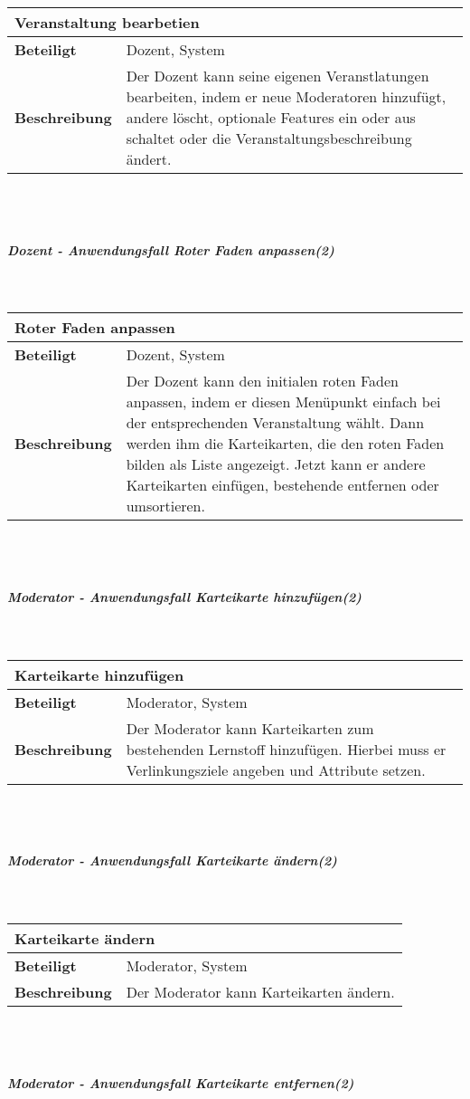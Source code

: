 \documentclass[12pt,a4paper]{article}
\begin{document}
\begin{tabular}{l p{10cm}}
\multicolumn{2}{l}{\textbf{Veranstaltung bearbetien}} \\ \hline
\textbf{Beteiligt} & Dozent, System \\ \hline 
\textbf{Beschreibung} & Der Dozent kann seine eigenen Veranstlatungen bearbeiten, indem er neue Moderatoren hinzufügt, andere löscht, optionale Features ein oder aus schaltet oder die Veranstaltungsbeschreibung ändert.\\ 
\hline 
\end{tabular}\\\\
\subparagraph{Dozent - Anwendungsfall \glqq Roter Faden anpassen\grqq (2)}\mbox{}\\

\begin{tabular}{l p{10cm}}
\multicolumn{2}{l}{\textbf{Roter Faden anpassen}} \\ \hline
\textbf{Beteiligt} & Dozent, System \\ \hline 
\textbf{Beschreibung} & Der Dozent kann den initialen roten Faden anpassen, indem er diesen Menüpunkt einfach bei der entsprechenden Veranstaltung wählt. Dann werden ihm die Karteikarten, die den roten Faden bilden als Liste angezeigt. Jetzt kann er andere Karteikarten einfügen, bestehende entfernen oder umsortieren.\\ 
\hline 
\end{tabular}\\\\
\subparagraph{Moderator - Anwendungsfall \glqq Karteikarte hinzufügen\grqq (2)}\mbox{}\\

\begin{tabular}{l p{10cm}}
\multicolumn{2}{l}{\textbf{Karteikarte hinzufügen}} \\ \hline
\textbf{Beteiligt} & Moderator, System \\ \hline 
\textbf{Beschreibung} & Der Moderator kann Karteikarten zum bestehenden Lernstoff hinzufügen. Hierbei muss er Verlinkungsziele angeben und Attribute setzen.\\ 
\hline 
\end{tabular}\\\\
\subparagraph{Moderator - Anwendungsfall \glqq Karteikarte ändern\grqq (2)}\mbox{}\\

\begin{tabular}{l p{10cm}}
\multicolumn{2}{l}{\textbf{Karteikarte ändern}} \\ \hline
\textbf{Beteiligt} & Moderator, System \\ \hline 
\textbf{Beschreibung} & Der Moderator kann Karteikarten ändern.\\ 
\hline 
\end{tabular}\\\\
\subparagraph{Moderator - Anwendungsfall \glqq Karteikarte entfernen\grqq (2)}\mbox{}\\
\end{document}

